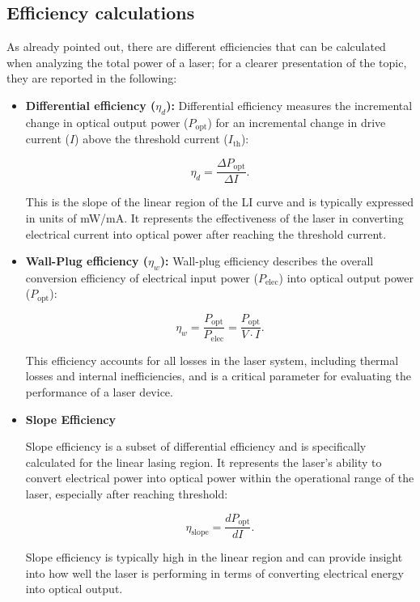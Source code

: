 \documentclass[prl,twocolumn]{revtex4-1}
\begin{document}
\subsection{Efficiency calculations}

As already pointed out, there are different efficiencies that can be calculated when analyzing the total power of a laser; for a clearer presentation of the topic, they are reported in the following:

\begin{itemize}
    \item \textbf{Differential efficiency (\(\eta_d\)):}
        Differential efficiency measures the incremental change in optical output power (\(P_{\text{opt}}\)) for an incremental change in drive current (\(I\)) above the threshold current (\(I_{\text{th}}\)):

        \begin{equation}
        \eta_d = \frac{\Delta P_{\text{opt}}}{\Delta I}.
        \end{equation}

        This is the slope of the linear region of the LI curve and is typically expressed in units of mW/mA. It represents the effectiveness of the laser in converting electrical current into optical power after reaching the threshold current.

    \item \textbf{Wall-Plug efficiency (\(\eta_w\)):}
        Wall-plug efficiency describes the overall conversion efficiency of electrical input power (\(P_{\text{elec}}\)) into optical output power (\(P_{\text{opt}}\)):

        \begin{equation}
        \eta_w = \frac{P_{\text{opt}}}{P_{\text{elec}}} = \frac{P_{\text{opt}}}{V       \cdot I}.
        \end{equation}

        This efficiency accounts for all losses in the laser system, including thermal losses and internal inefficiencies, and is a critical parameter for evaluating the performance of a laser device.

    \item \textbf{Slope Efficiency}

        Slope efficiency is a subset of differential efficiency and is specifically calculated for the linear lasing region. It represents the laser's ability to convert electrical power into optical power within the operational range of the laser, especially after reaching threshold:

        \begin{equation}
        \eta_{\text{slope}} = \frac{dP_{\text{opt}}}{dI}.
        \end{equation}
        
        Slope efficiency is typically high in the linear region and can provide insight into how well the laser is performing in terms of converting electrical energy into optical output.
\end{itemize}
\end{document}
